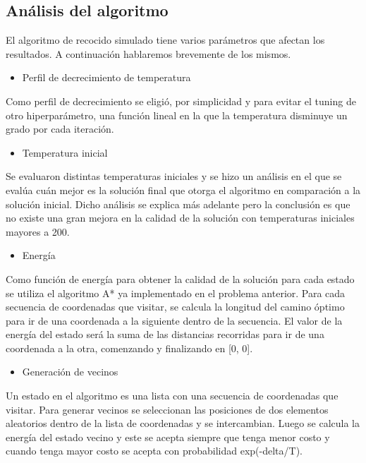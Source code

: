 \documentclass[
]{article}
\providecommand{\tightlist}{%
  \setlength{\itemsep}{0pt}\setlength{\parskip}{0pt}}
\begin{document}
\hypertarget{anuxe1lisis-del-algoritmo}{%
\subsection{Análisis del algoritmo}\label{anuxe1lisis-del-algoritmo}}

El algoritmo de recocido simulado tiene varios parámetros que afectan
los resultados. A continuación hablaremos brevemente de los mismos.

\begin{itemize}
\tightlist
\item
  Perfil de decrecimiento de temperatura
\end{itemize}

Como perfil de decrecimiento se eligió, por simplicidad y para evitar el
tuning de otro hiperparámetro, una función lineal en la que la
temperatura disminuye un grado por cada iteración.

\begin{itemize}
\tightlist
\item
  Temperatura inicial
\end{itemize}

Se evaluaron distintas temperaturas iniciales y se hizo un análisis en
el que se evalúa cuán mejor es la solución final que otorga el algoritmo
en comparación a la solución inicial. Dicho análisis se explica más
adelante pero la conclusión es que no existe una gran mejora en la
calidad de la solución con temperaturas iniciales mayores a 200.

\begin{itemize}
\tightlist
\item
  Energía
\end{itemize}

Como función de energía para obtener la calidad de la solución para cada
estado se utiliza el algoritmo A* ya implementado en el problema
anterior. Para cada secuencia de coordenadas que visitar, se calcula la
longitud del camino óptimo para ir de una coordenada a la siguiente
dentro de la secuencia. El valor de la energía del estado será la suma
de las distancias recorridas para ir de una coordenada a la otra,
comenzando y finalizando en {[}0, 0{]}.

\begin{itemize}
\tightlist
\item
  Generación de vecinos
\end{itemize}

Un estado en el algoritmo es una lista con una secuencia de coordenadas
que visitar. Para generar vecinos se seleccionan las posiciones de dos
elementos aleatorios dentro de la lista de coordenadas y se
intercambian. Luego se calcula la energía del estado vecino y este se
acepta siempre que tenga menor costo y cuando tenga mayor costo se
acepta con probabilidad exp(-delta/T).
\end{document}
